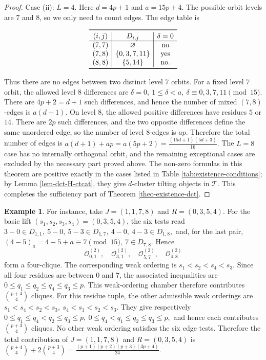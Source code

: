 \documentclass[12pt]{article}
\theoremstyle{plain}
\theoremstyle{definition}
\newtheorem{Example}[Def]{Example}
\newcommand{\T}{\mathcal{T}}
\renewcommand{\leq}{\leqslant}
\begin{document}
\begin{proof}
Case (ii): \(L=4\).  Here \(d=4p+1\) and \(a=15p+4\).  The possible orbit
levels are \(7\) and \(8\), so we only need to count edges.  The edge table is
\begin{center}
\[
\begin{array}{c|c|c}
\toprule
(i,j)&D_{i,j}&\delta=0\\
\hline
(7,7)&\varnothing&\text{no}\\
(7,8)&\{0,3,7,11\}&\text{yes}\\
(8,8)&\{5,14\}&\text{no}.\\
\bottomrule
\end{array}
\]
\label{tab:E8-L4-Dij}
\end{center}
Thus there are no edges between two distinct level \(7\) orbits.  For a fixed
level \(7\) orbit, the allowed level \(8\) differences are
\(\delta=0,\ 1\leq\delta<a,\ \delta\equiv0,3,7,11\pmod {15}.\)
There are \(4p+2=d+1\) such differences, and hence the number of mixed
\((7,8)\)-edges is \(a(d+1)\).  On level \(8\), the allowed positive
differences have residues \(5\) or \(14\).  There are \(2p\) such differences,
and the two opposite differences define the same unordered edge, so the number
of level \(8\)-edges is \(ap\).  Therefore the total number of edges is
\(a(d+1)+ap=a(5p+2) =\frac{(15d+1)(5d+3)}{16}.\)
The \(L=8\) case has no internally orthogonal orbit, and the remaining
exceptional cases are excluded by the necessary part proved above.  The
non-zero formulas in this theorem are positive exactly in the cases listed in
Table \ref{tab:existence-conditions}; by Lemma \ref{lem-dct-H-ctcat}, they give
\(d\)-cluster tilting objects in \(\T\).  This completes the sufficiency part
of Theorem \ref{theo-existence-dct}.
\end{proof}

\begin{Example}
    For instance, take \(J=(1,1,7,8)\) and \(R=(0,3,5,4)\).  For the basic lift
\((s_1,s_2,s_3,s_4)=(0,3,5,4)\), the six tests read
\(3-0\in D_{1,1},\ 5-0,\ 5-3\in D_{1,7},\ 4-0,\ 4-3\in D_{1,8},\)
and, for the last pair,
\((4-5)_a=4-5+a\equiv 7\pmod {15},\ 7\in D_{7,8}.\)
Hence
\[
\mathcal{O}_{0,1}^{(2)},\quad
\mathcal{O}_{3,1}^{(2)},\quad
\mathcal{O}_{5,7}^{(2)},\quad
\mathcal{O}_{4,8}^{(2)}
\]
form a four-clique.  The corresponding weak ordering is
\(s_1<s_2<s_4<s_3.\)
Since all four residues are between \(0\) and \(7\), the associated inequalities
are
\(0\leq q_1\leq q_2\leq q_4\leq q_3\leq p.\)
This weak-ordering chamber therefore contributes
\(\binom{p+4}{4}\)
cliques.  For this residue tuple, the other admissible weak orderings are
\(s_1<s_4<s_2<s_3,\ s_4<s_1<s_2<s_3.\)
They give respectively
\(0\leq q_1\leq q_4<q_2\leq q_3\leq p,\ 0\leq q_4<q_1\leq q_2\leq q_3\leq p,\)
and hence each contributes
\(\binom{p+3}{4}\)
cliques.  No other weak ordering satisfies the six edge tests.  Therefore the
total contribution of \(J=(1,1,7,8)\) and \(R=(0,3,5,4)\) is
\(\binom{p+4}{4}+2\binom{p+3}{4} =\frac{(p+1)(p+2)(p+3)(3p+4)}{24}.\)
\end{Example}
\end{document}
